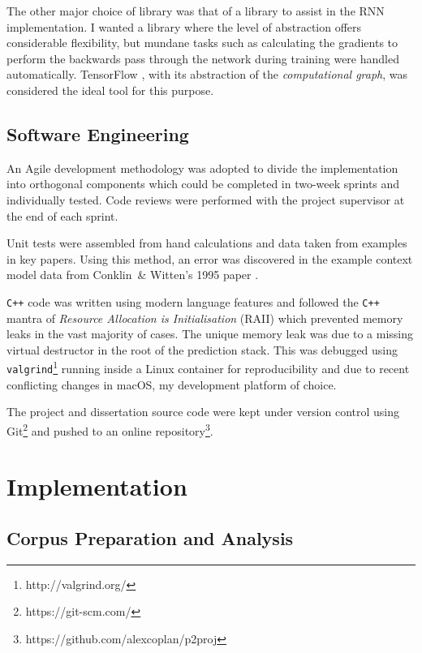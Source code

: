 \documentclass[12pt,a4paper,twoside,openright]{report}
\begin{document}
The other major choice of library was that of a library to assist in the RNN
implementation. I wanted a library where the level of abstraction offers
considerable flexibility, but mundane tasks such as calculating the gradients to
perform the backwards pass through the network during training were handled
automatically. TensorFlow \cite{abadi2016tensorflow}, with its abstraction of
the \emph{computational graph}, was considered the ideal tool for this purpose.

\section{Software Engineering}

An Agile development methodology was adopted to divide the implementation into
orthogonal components which could be completed in two-week sprints and
individually tested. Code reviews were performed with the project supervisor at
the end of each sprint. 

Unit tests were assembled from hand calculations and data taken from examples in
key papers. Using this method, an error was discovered in the example context
model data from Conklin\ \& Witten's 1995 paper \cite{conklin1995viewpoints}.

\texttt{C++} code was written using modern language features and followed the
\texttt{C++} mantra of \emph{Resource Allocation is Initialisation} (RAII) which
prevented memory leaks in the vast majority of cases. The unique memory leak was
due to a missing virtual destructor in the root of the prediction stack. This
was debugged using \texttt{valgrind}\footnote{http://valgrind.org/} running
inside a Linux container for reproducibility and due to recent conflicting
changes in macOS, my development platform of choice.

The project and dissertation source code were kept under version control using
Git\footnote{https://git-scm.com/} and pushed to an online
repository\footnote{https://github.com/alexcoplan/p2proj}.

\chapter{Implementation}\label{chap:impl}

\section{Corpus Preparation and Analysis}\label{sec:corpus-prep-analysis}
\end{document}
